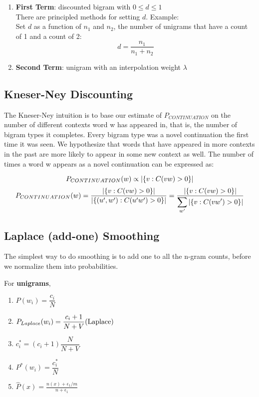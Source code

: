 \begin{enumerate}
    \item \textbf{First Term}: discounted bigram with $0 \leq d \leq 1$\\
    There are principled methods for setting $d$. Example:\\
    Set $d$ as a function of $n_1$ and $n_2$, the number of unigrams that have a count of 1 and a count of 2:\\
    \[
        d = \dfrac{n_1}{n_1 + n_2}
    \]
    \item \textbf{Second Term}: unigram with an interpolation weight $\lambda$
\end{enumerate}

\subsection{Kneser-Ney Discounting}\label{Kneser-Ney Discounting}
The Kneser-Ney intuition is to base our estimate of $P_{CONTINUATION}$ on the number of different contexts word w has appeared in, that is, the number of bigram types it completes. Every bigram type was a novel continuation the first time it was seen. We hypothesize that words that have appeared in more contexts in the
past are more likely to appear in some new context as well. The number of times a word w appears as a novel continuation can be expressed as:

\[
    P_{CONTINUATION}(w) \propto \left| \left\{v : C(vw) > 0\right\} \right|
\]
\[
    P_{CONTINUATION}(w) = \dfrac{\left| \left\{v : C(vw) > 0\right\} \right|}{\left| \left\{(u',w') : C(u'w') > 0\right\} \right| } = \dfrac{\left| \left\{v : C(vw) > 0\right\} \right|}{\displaystyle\sum_{w'} \left| \left\{v : C(vw') > 0\right\} \right|}
\]

\subsection{Laplace (add-one) Smoothing \cite{nlp-1,dnn-1}}
The simplest way to do smoothing is to add one to all the n-gram counts, before we normalize them into probabilities.





\noindent
For \textbf{unigrams},
\begin{enumerate}[itemsep=0.15cm]
    \item $P(w_i) = \dfrac{c_i}{N}$
    
    \item $P_{Laplace}(w_i) = \dfrac{c_i + 1}{N + V} \hfill \text{(Laplace)}$
    
    \item $c_i^* = (c_i +1)\dfrac{N}{N + V}$
        
    \item $P^*(w_i) = \dfrac{c_i^*}{N}$

    \item $\hat{P}(x) = \frac{n(x) + \epsilon_1/m}{n + \epsilon_1}$ \hfill \cite{dnn-1}
\end{enumerate}


